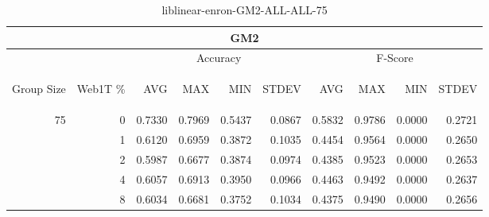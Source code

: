 \begin{center}
\begin{table}[htbp]
\begin{tabular}{ | r | r | r | r | r | r | r | r | r | r |}
\hline
\multicolumn{10}{|c|}{GM2}\\
\hline
 & & \multicolumn{4}{|c|}{Accuracy} & \multicolumn{4}{|c|}{F-Score}\\ \cline{3-10}
\begin{sideways}Group Size\end{sideways} & \begin{sideways}Web1T \%\end{sideways} & \begin{sideways}AVG\end{sideways} & \begin{sideways}MAX\end{sideways} & \begin{sideways}MIN\end{sideways} & \begin{sideways}STDEV\end{sideways} & \begin{sideways}AVG\end{sideways} & \begin{sideways}MAX\end{sideways} & \begin{sideways}MIN\end{sideways} & \begin{sideways}STDEV\end{sideways}\\
\hline
\multirow{5}{*}{75}
 & 0 & 0.7330 & 0.7969 & 0.5437 & 0.0867 & 0.5832 & 0.9786 & 0.0000 & 0.2721\\ \cline{2-10}
 & 1 & 0.6120 & 0.6959 & 0.3872 & 0.1035 & 0.4454 & 0.9564 & 0.0000 & 0.2650\\ \cline{2-10}
 & 2 & 0.5987 & 0.6677 & 0.3874 & 0.0974 & 0.4385 & 0.9523 & 0.0000 & 0.2653\\ \cline{2-10}
 & 4 & 0.6057 & 0.6913 & 0.3950 & 0.0966 & 0.4463 & 0.9492 & 0.0000 & 0.2637\\ \cline{2-10}
 & 8 & 0.6034 & 0.6681 & 0.3752 & 0.1034 & 0.4375 & 0.9490 & 0.0000 & 0.2656\\ \cline{2-10}
\hline
\end{tabular}
\caption{liblinear-enron-GM2-ALL-ALL-75}
\end{table}
\end{center}

